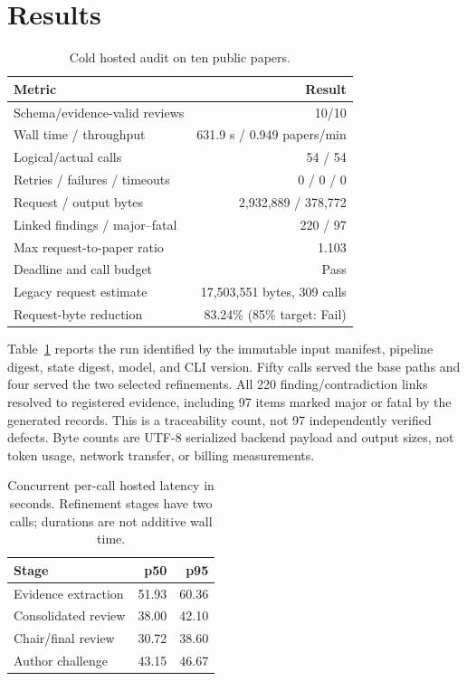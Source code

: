 \documentclass{article}
\begin{document}
\section{Results}

\begin{table}[t]
\caption{Cold hosted audit on ten public papers.}
\label{tab:main}
\centering
\scriptsize
\setlength{\tabcolsep}{2pt}
\begin{tabular}{@{}lr@{}}
\toprule
Metric & Result \\
\midrule
Schema/evidence-valid reviews & 10/10 \\
Wall time / throughput & 631.9 s / 0.949 papers/min \\
Logical/actual calls & 54 / 54 \\
Retries / failures / timeouts & 0 / 0 / 0 \\
Request / output bytes & 2,932,889 / 378,772 \\
Linked findings / major--fatal & 220 / 97 \\
Max request-to-paper ratio & 1.103 \\
Deadline and call budget & Pass \\
Legacy request estimate & 17,503,551 bytes, 309 calls \\
Request-byte reduction & 83.24\% (85\% target: Fail) \\
\bottomrule
\end{tabular}
\end{table}

Table~\ref{tab:main} reports the run identified by the immutable input
manifest, pipeline digest, state digest, model, and CLI version. Fifty calls
served the base paths and four served the two selected refinements. All 220
finding/contradiction links resolved to registered evidence, including 97
items marked major or fatal by the generated records. This is a traceability
count, not 97 independently verified defects.
Byte counts are UTF-8 serialized backend payload and output sizes, not token
usage, network transfer, or billing measurements.

\begin{table}[t]
\caption{Concurrent per-call hosted latency in seconds. Refinement stages have
two calls; durations are not additive wall time.}
\label{tab:latency}
\centering
\small
\setlength{\tabcolsep}{6pt}
\begin{tabular}{@{}lrr@{}}
\toprule
Stage & p50 & p95 \\
\midrule
Evidence extraction & 51.93 & 60.36 \\
Consolidated review & 38.00 & 42.10 \\
Chair/final review & 30.72 & 38.60 \\
Author challenge & 43.15 & 46.67 \\
\bottomrule
\end{tabular}
\end{table}
\end{document}
